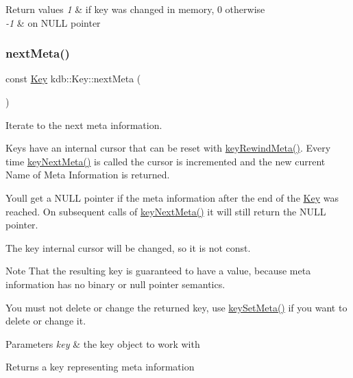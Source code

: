 \begin{DoxyRetVals}{Return values}
{\em 1} & if {\ttfamily key} was changed in memory, 0 otherwise \\
\hline
{\em -\/1} & on N\+U\+LL pointer \\
\hline
\end{DoxyRetVals}
\mbox{\label{classkdb_1_1Key_a855f37fef58a4ea4006d9e281f66cfe1}} 
\subsubsection{\texorpdfstring{next\+Meta()}{nextMeta()}}
{\footnotesize\ttfamily const \hyperlink{classkdb_1_1Key}{Key} kdb\+::\+Key\+::next\+Meta (\begin{DoxyParamCaption}{ }\end{DoxyParamCaption})\hspace{0.3cm}{\ttfamily [inline]}}



Iterate to the next meta information. 

Keys have an internal cursor that can be reset with \hyperlink{group__keymeta_ga5dbb669802eea27e106ee3a5e39717a9}{key\+Rewind\+Meta()}. Every time \hyperlink{group__keymeta_ga4c88342f580a4291455a801af71ce048}{key\+Next\+Meta()} is called the cursor is incremented and the new current Name of Meta Information is returned.

You\textquotesingle{}ll get a N\+U\+LL pointer if the meta information after the end of the \hyperlink{classkdb_1_1Key}{Key} was reached. On subsequent calls of \hyperlink{group__keymeta_ga4c88342f580a4291455a801af71ce048}{key\+Next\+Meta()} it will still return the N\+U\+LL pointer.

The {\ttfamily key} internal cursor will be changed, so it is not const.

\begin{DoxyNote}{Note}
That the resulting key is guaranteed to have a value, because meta information has no binary or null pointer semantics.

You must not delete or change the returned key, use \hyperlink{group__keymeta_gae1f15546b234ffb6007d8a31178652b9}{key\+Set\+Meta()} if you want to delete or change it.
\end{DoxyNote}

\begin{DoxyParams}{Parameters}
{\em key} & the key object to work with \\
\hline
\end{DoxyParams}
\begin{DoxyReturn}{Returns}
a key representing meta information 
\end{DoxyReturn}

